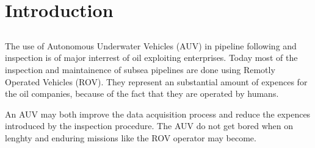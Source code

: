 \chapter{Introduction}

\section{}
	The use of Autonomous Underwater Vehicles (AUV) in pipeline following and inspection is of major interrest of oil exploiting enterprises. Today most of the inspection and maintainence of subsea pipelines are done using Remotly Operated Vehicles (ROV). They represent an substantial amount of expences for the oil companies, because of the fact that they are operated by humans. 
	
	An AUV may both improve the data acquisition process and reduce the expences introduced by the inspection procedure. The AUV do not get bored when on lenghty and enduring missions like the ROV operator may become. 
	
	
	